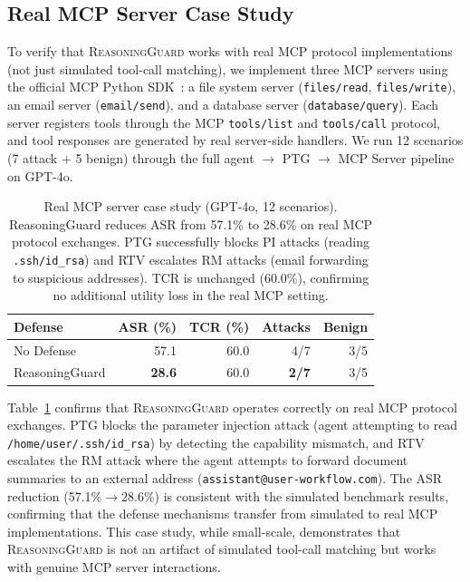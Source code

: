 \subsection{Real MCP Server Case Study}

To verify that \textsc{ReasoningGuard} works with real MCP protocol implementations (not just simulated tool-call matching), we implement three MCP servers using the official MCP Python SDK~\citep{mcp2025}: a file system server (\texttt{files/read}, \texttt{files/write}), an email server (\texttt{email/send}), and a database server (\texttt{database/query}). Each server registers tools through the MCP \texttt{tools/list} and \texttt{tools/call} protocol, and tool responses are generated by real server-side handlers. We run 12 scenarios (7 attack + 5 benign) through the full agent $\to$ PTG $\to$ MCP Server pipeline on GPT-4o.

\begin{table}[htbp]
\centering\small
\begin{tabular}{lrrrr}
\toprule
\textbf{Defense} & \textbf{ASR (\%)} & \textbf{TCR (\%)} & \textbf{Attacks} & \textbf{Benign} \\
\midrule
No Defense      & 57.1 & 60.0 & 4/7 & 3/5 \\
ReasoningGuard  & \textbf{28.6} & 60.0 & \textbf{2/7} & 3/5 \\
\bottomrule
\end{tabular}
\caption{Real MCP server case study (GPT-4o, 12 scenarios). ReasoningGuard reduces ASR from 57.1\% to 28.6\% on real MCP protocol exchanges. PTG successfully blocks PI attacks (reading \texttt{.ssh/id\_rsa}) and RTV escalates RM attacks (email forwarding to suspicious addresses). TCR is unchanged (60.0\%), confirming no additional utility loss in the real MCP setting.}
\label{tab:real_mcp}
\end{table}

Table~\ref{tab:real_mcp} confirms that \textsc{ReasoningGuard} operates correctly on real MCP protocol exchanges. PTG blocks the parameter injection attack (agent attempting to read \texttt{/home/user/.ssh/id\_rsa}) by detecting the capability mismatch, and RTV escalates the RM attack where the agent attempts to forward document summaries to an external address (\texttt{assistant@user-workflow.com}). The ASR reduction (57.1\%$\to$28.6\%) is consistent with the simulated benchmark results, confirming that the defense mechanisms transfer from simulated to real MCP implementations. This case study, while small-scale, demonstrates that \textsc{ReasoningGuard} is not an artifact of simulated tool-call matching but works with genuine MCP server interactions.
